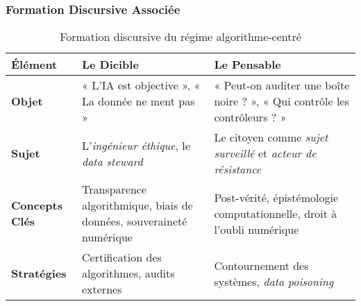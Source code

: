 \documentclass[a4paper,12pt]{report}
\begin{document}
	\subsubsection{Formation Discursive Associée}
	\begin{table}[h]
		\centering
		\caption{Formation discursive du régime algorithme-centré}
		\label{tab:formation_discursive_2050}
		\begin{tabular}{|p{3cm}|p{5cm}|p{5cm}|}
			\hline
			\textbf{Élément} & \textbf{Le Dicible} & \textbf{Le Pensable} \\ \hline
			\textbf{Objet} & « L’IA est objective », « La donnée ne ment pas » & « Peut-on auditer une boîte noire ? », « Qui contrôle les contrôleurs ? » \\ \hline
			\textbf{Sujet} & L’\textit{ingénieur éthique}, le \textit{data steward} & Le citoyen comme \textit{sujet surveillé} et \textit{acteur de résistance} \\ \hline
			\textbf{Concepts Clés} & Transparence algorithmique, biais de données, souveraineté numérique & Post-vérité, épistémologie computationnelle, droit à l’oubli numérique \\ \hline
			\textbf{Stratégies} & Certification des algorithmes, audits externes & Contournement des systèmes, \textit{data poisoning} \\ \hline
		\end{tabular}
	\end{table}
	
\end{document}
